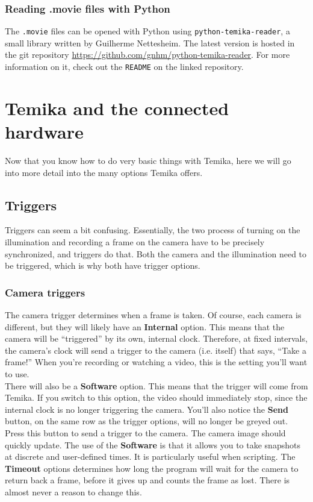 \documentclass{report}
\begin{document}
\subsection{Reading .movie files with Python}

The \verb|.movie| files can be opened with Python using \verb|python-temika-reader|, a small library written by Guilherme Nettesheim. The latest version is hosted in the git repository \url{https://github.com/gnhm/python-temika-reader}. For more information on it, check out the \verb|README| on the linked repository.

\newpage

\chapter{Temika and the connected hardware}

Now that you know how to do very basic things with Temika, here we will go into more detail into the many options Temika offers.


\section{Triggers}

Triggers can seem a bit confusing. Essentially, the two process of turning on the illumination and recording a frame on the camera have to be precisely synchronized, and triggers do that.     Both the camera and the illumination need to be triggered, which is why both have trigger options.\\

\subsection{Camera triggers}

The camera trigger determines when a frame is taken. Of course, each camera is different, but they will likely have an \textbf{Internal} option. This means that the camera will be ``triggered'' by its own, internal clock. Therefore, at fixed intervals, the camera's clock will send a trigger to the camera (i.e. itself) that says, ``Take a frame!'' When you're recording or watching a video, this is the setting you'll want to use.\\

There will also be a \textbf{Software} option. This means that the trigger will come from Temika. If you switch to this option, the video should immediately stop, since the internal clock is no longer triggering the camera. You'll also notice the \textbf{Send} button, on the same row as the trigger options, will no longer be greyed out. Press this button to send a trigger to the camera. The camera image should quickly update. The use of the \textbf{Software} is that it allows you to take snapshots at discrete and user-defined times. It is particularly useful when scripting. The \textbf{Timeout} options determines how long the program will wait for the camera to return back a frame, before it gives up and counts the frame as lost. There is almost never a reason to change this.\\
\end{document}
